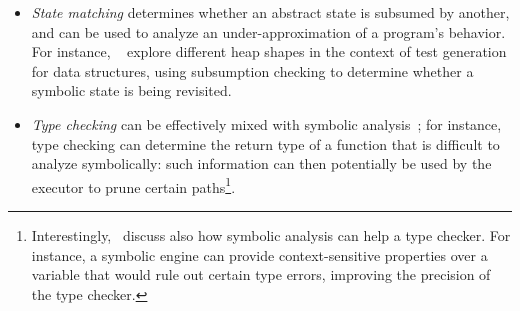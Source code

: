 \begin{itemize}
  \item {\em State matching} determines whether an abstract state is subsumed by another, and can be used to analyze an under-approximation of a program's behavior. For instance, ~\cite{APV-SPIN06,VPP-ISSTA06} explore different heap shapes in the context of test generation for data structures, using subsumption checking to determine whether a symbolic state is being revisited. %
  \item {\em Type checking} can be effectively mixed with symbolic analysis~\cite{KCF-PLDI10};  for instance, type checking can determine the return type of a function that is difficult to analyze symbolically: such information can then potentially be used by the executor to prune certain paths\footnote{Interestingly,~\cite{KCF-PLDI10} discuss also how symbolic analysis can help a type checker. For instance, a symbolic engine can provide context-sensitive properties over a variable that would rule out certain type errors, improving the precision of the type checker.}.
\end{itemize}


